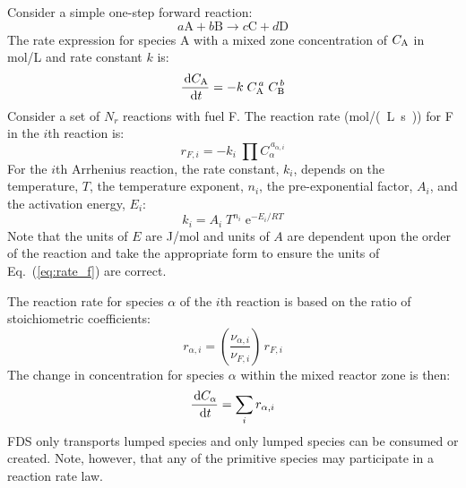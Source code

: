 Consider a simple one-step forward reaction:
\begin{equation}\label{eq:generic_1step}
a\mathrm{A} + b\mathrm{B} \rightarrow c\mathrm{C} + d\mathrm{D}
\end{equation}
The rate expression for species A with a mixed zone concentration of $C_{\mbox{\scriptsize A}}$ in mol/L and rate constant $k$ is:
\begin{equation}\label{eq:generic_rate}
\frac{\,\mathrm{d} C_{\mbox{\scriptsize A}}}{\,\mathrm{d} t}= -k\; C_{\mbox{\scriptsize A}}^{\,a}\; C_{\mbox{\scriptsize B}}^{\,b}
\end{equation}
Consider a set of $N_r$ reactions with fuel F. The reaction rate (\si{mol/(L.s)}) for F in the $i$th reaction is:
\begin{equation}\label{eq:rate_f}
r_{\si{F},i}= -k_{i}\; \prod C_{\alpha}^{\,a_{\alpha,i}}
\end{equation}
For the $i$th Arrhenius reaction, the rate constant, $k_i$, depends on the temperature, $T$, the temperature exponent, $n_i$, the pre-exponential factor, $A_i$, and the activation energy, $E_i$:
\begin{equation}\label{eq:rate_cons}
k_i = A_i\;T^{n_i}\;\mathrm{e}^{-E_i/RT}
\end{equation}
Note that the units of $E$ are J/mol and units of $A$ are dependent upon the order of the reaction and take the appropriate form to ensure the units of Eq.~(\ref{eq:rate_f}) are correct.

The reaction rate for species $\alpha$ of the $i$th reaction is based on the ratio of stoichiometric coefficients:
\begin{equation}\label{eq:rate_a}
r_{\alpha,i}= \left(\frac{\nu_{\alpha,i}}{\nu_{F,i}}\right)\,r_{\si{F},i}
\end{equation}
The change in concentration for species $\alpha$ within the mixed reactor zone is then:
\begin{equation}\label{rate_expression}
\frac{\,\mathrm{d} C_{\alpha}}{\,\mathrm{d} t} = \sum_{i} r_{\alpha,i}
\end{equation}
FDS only transports lumped species and only lumped species can be consumed or created.  Note, however, that any of the primitive species may participate in a reaction rate law.

